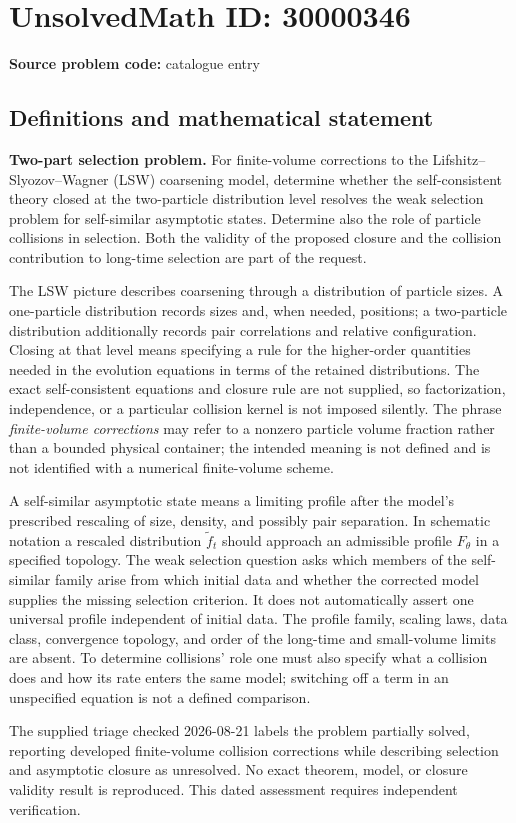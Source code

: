 \documentclass[11pt]{article}
\begin{document}
\section*{UnsolvedMath ID: 30000346}
\textbf{Source problem code:} catalogue entry
\subsection{Definitions and mathematical statement}
\textbf{Two-part selection problem.} For finite-volume corrections to the Lifshitz--Slyozov--Wagner (LSW) coarsening model, determine whether the self-consistent theory closed at the two-particle distribution level resolves the weak selection problem for self-similar asymptotic states. Determine also the role of particle collisions in selection. Both the validity of the proposed closure and the collision contribution to long-time selection are part of the request.\par The LSW picture describes coarsening through a distribution of particle sizes. A one-particle distribution records sizes and, when needed, positions; a two-particle distribution additionally records pair correlations and relative configuration. Closing at that level means specifying a rule for the higher-order quantities needed in the evolution equations in terms of the retained distributions. The exact self-consistent equations and closure rule are not supplied, so factorization, independence, or a particular collision kernel is not imposed silently. The phrase \emph{finite-volume corrections} may refer to a nonzero particle volume fraction rather than a bounded physical container; the intended meaning is not defined and is not identified with a numerical finite-volume scheme.\par A self-similar asymptotic state means a limiting profile after the model's prescribed rescaling of size, density, and possibly pair separation. In schematic notation a rescaled distribution \(\widetilde f_t\) should approach an admissible profile \(F_\theta\) in a specified topology. The weak selection question asks which members of the self-similar family arise from which initial data and whether the corrected model supplies the missing selection criterion. It does not automatically assert one universal profile independent of initial data. The profile family, scaling laws, data class, convergence topology, and order of the long-time and small-volume limits are absent. To determine collisions' role one must also specify what a collision does and how its rate enters the same model; switching off a term in an unspecified equation is not a defined comparison.\par The supplied triage checked 2026-08-21 labels the problem partially solved, reporting developed finite-volume collision corrections while describing selection and asymptotic closure as unresolved. No exact theorem, model, or closure validity result is reproduced. This dated assessment requires independent verification.
\end{document}
